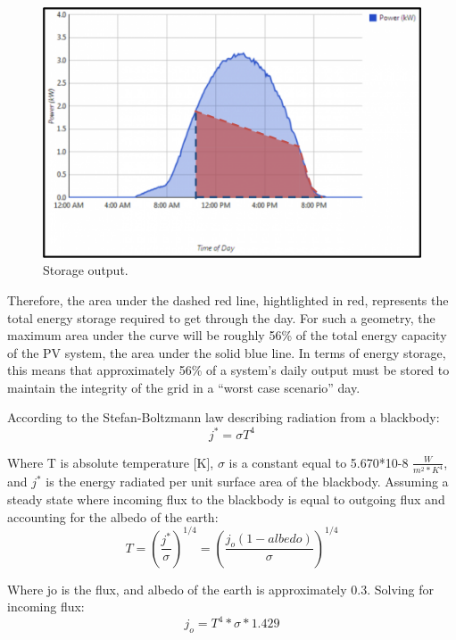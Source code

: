 \begin{figure}
\begin{center}
\includegraphics[scale=0.6]{pics/PatrickFigure2.png}
\caption{Storage output.}
\label{p2}
\end{center}
\end{figure}

Therefore, the area under the dashed red line, hightlighted in red, represents
the total energy storage required to get through the day. For such a geometry,
the maximum area under the curve will be roughly 56\% of the total energy
capacity of the PV system, the area under the solid blue line. In terms of
energy storage, this means that approximately 56\% of a system’s daily output
must be stored to maintain the integrity of the grid in a ``worst case scenario''
day.

According to the Stefan-Boltzmann law describing radiation from a blackbody:
\begin{equation}
j^* = \sigma T^4
\end{equation}

Where T is absolute temperature [K], $\sigma$ is a constant equal to 5.670*10-8
$\frac{W}{m^2*K^4}$, and $j^*$ is the energy radiated per unit surface area of
the blackbody.
Assuming a steady state where incoming flux to the blackbody is equal to
outgoing flux and accounting for the albedo of the earth:
\begin{equation}
T={(\frac{j^*}{\sigma})}^{1/4}=(\frac{j_o(1-albedo)}{\sigma})^{1/4}
\end{equation}

Where jo is the flux, and albedo of the earth is approximately 0.3. Solving for
incoming flux:
\begin{equation}
j_o=T^4*\sigma*1.429
\end{equation}

